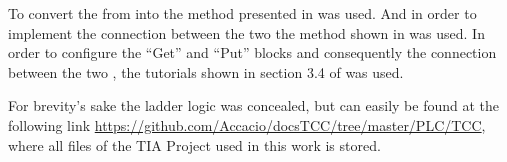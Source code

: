 

To convert the \CIPN{} from  into \LD{} the method
presented in  was used. And in order to implement the connection
between the two \PLCs{} the method shown in  was used.
In order to configure the ``Get'' and ``Put'' blocks and consequently the
connection between the two \PLCs, the tutorials shown in
section 3.4 of \cite{rochapereira2019automacao} was used.

For
brevity's sake the ladder logic was concealed, but can easily be
found at the following link
\url{https://github.com/Accacio/docsTCC/tree/master/PLC/TCC}, where all files of the TIA
Project used in this work is stored.




